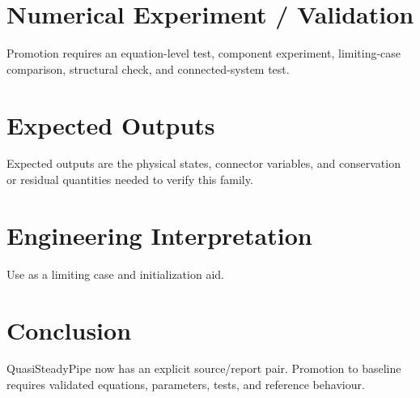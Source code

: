 \documentclass[10pt,a4paper]{article}
\begin{document}
\section{Numerical Experiment / Validation}Promotion requires an equation-level test, component experiment, limiting-case comparison, structural check, and connected-system test.
\section{Expected Outputs}Expected outputs are the physical states, connector variables, and conservation or residual quantities needed to verify this family.
\section{Engineering Interpretation}Use as a limiting case and initialization aid.
\section*{Conclusion}QuasiSteadyPipe now has an explicit source/report pair. Promotion to baseline requires validated equations, parameters, tests, and reference behaviour.
\end{document}
